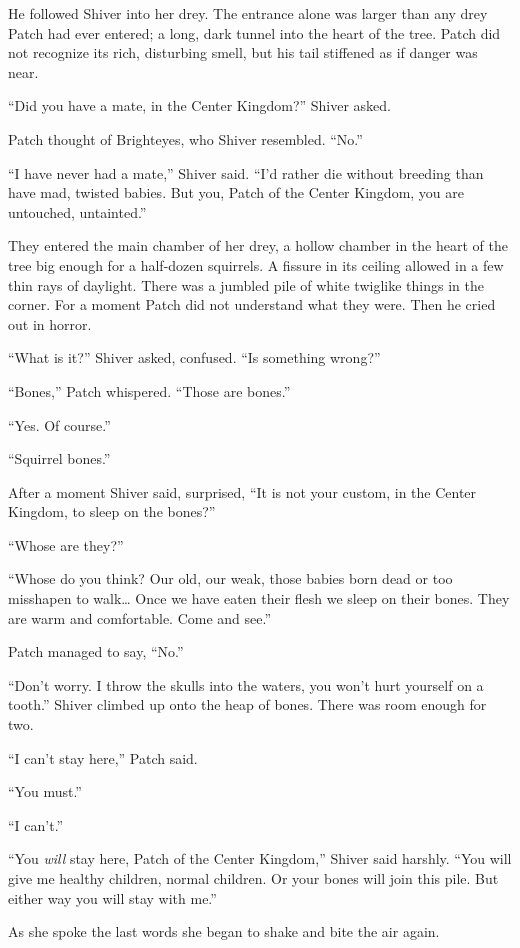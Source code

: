 \documentclass[ebook,oneside,openany,17pt]{memoir}
\begin{document}
He followed Shiver into her drey. The entrance alone was larger than
any drey Patch had ever entered; a long, dark tunnel into the heart of
the tree. Patch did not recognize its rich, disturbing smell, but his
tail stiffened as if danger was near.

“Did you have a mate, in the Center Kingdom?” Shiver asked.

Patch thought of Brighteyes, who Shiver resembled. “No.”

“I have never had a mate,” Shiver said. “I’d rather die without
breeding than have mad, twisted babies. But you, Patch of the Center
Kingdom, you are untouched, untainted.”

They entered the main chamber of her drey, a hollow chamber in the
heart of the tree big enough for a half-dozen squirrels. A fissure in
its ceiling allowed in a few thin rays of daylight. There was a
jumbled pile of white twiglike things in the corner. For a moment
Patch did not understand what they were. Then he cried out in horror.

“What is it?” Shiver asked, confused. “Is something wrong?”

“Bones,” Patch whispered. “Those are bones.”

“Yes. Of course.”

“Squirrel bones.”

After a moment Shiver said, surprised, “It is not your custom, in the
Center Kingdom, to sleep on the bones?”

“Whose are they?”

“Whose do you think? Our old, our weak, those babies born dead or too
misshapen to walk… Once we have eaten their flesh we sleep on their
bones. They are warm and comfortable. Come and see.”

Patch managed to say, “No.”

“Don’t worry. I throw the skulls into the waters, you won’t hurt
yourself on a tooth.” Shiver climbed up onto the heap of bones. There
was room enough for two.

“I can’t stay here,” Patch said.

“You must.”

“I can’t.”

“You \emph{will} stay here, Patch of the Center Kingdom,” Shiver
said harshly. “You will give me healthy children, normal children. Or
your bones will join this pile. But either way you will stay with me.”

As she spoke the last words she began to shake and bite the air again.
\end{document}
